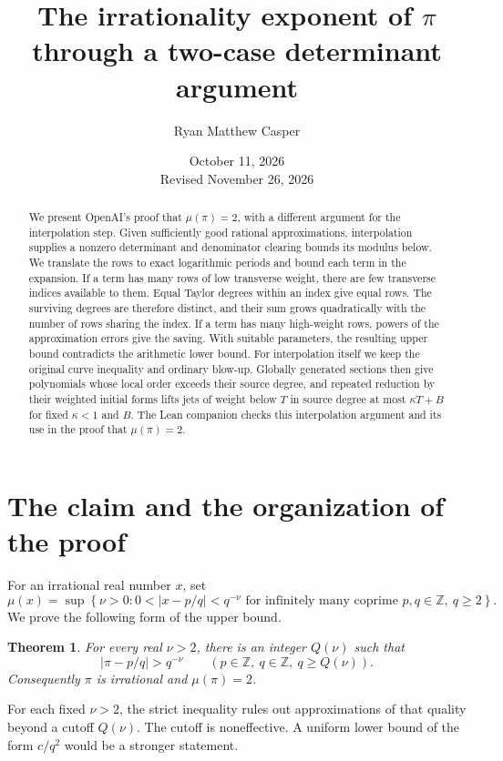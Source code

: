 \documentclass[11pt]{article}
\title{The irrationality exponent of \(\pi\)\\through a two-case determinant argument}
\author{Ryan Matthew Casper}
\date{October 11, 2026\\Revised November 26, 2026}
\newtheorem{theorem}{Theorem}[section]
\theoremstyle{definition}
\theoremstyle{remark}
\newcommand{\Z}{\mathbb Z}
\numberwithin{equation}{section}
\begin{document}
\maketitle
\begin{abstract}
We present OpenAI's proof that \(\mu(\pi)=2\), with a different argument
for the interpolation step. Given sufficiently good rational
approximations, interpolation supplies a nonzero determinant and
denominator clearing bounds its modulus below. We translate the rows
to exact logarithmic periods and bound each term in the expansion.
If a term has many rows of low transverse weight, there are few
transverse indices available to them. Equal Taylor degrees within an
index give equal rows. The surviving degrees are therefore distinct,
and their sum grows quadratically with the number of rows sharing the
index. If a term has many high-weight rows, powers of the approximation
errors give the saving. With suitable parameters, the resulting upper
bound contradicts the arithmetic lower bound.
For interpolation itself we keep the original curve inequality and
ordinary blow-up. Globally generated sections then give polynomials
whose local order exceeds their source degree, and repeated reduction
by their weighted initial forms lifts jets of weight below \(T\) in
source degree at most \(\kappa T+B\) for fixed \(\kappa<1\) and \(B\). The Lean
companion checks this interpolation argument and its use in the
proof that \(\mu(\pi)=2\).
\end{abstract}

\begingroup
\small
\setlength{\parskip}{0pt}
\tableofcontents
\endgroup
\clearpage

\section{The claim and the organization of the proof}
For an irrational real number \(x\), set
\[
 \mu(x)=\sup\left\{\nu>0:
 0<|x-p/q|<q^{-\nu}\text{ for infinitely many coprime }p,q\in\Z,
 \ q\ge2\right\}.
\]
We prove the following form of the upper bound.
\begin{theorem}\label{thm:main}
For every real \(\nu>2\), there is an integer \(Q(\nu)\) such that
\[
 |\pi-p/q|>q^{-\nu}\qquad(p\in\Z,\ q\in\Z,\ q\ge Q(\nu)).
\]
Consequently \(\pi\) is irrational and \(\mu(\pi)=2\).
\end{theorem}

For each fixed \(\nu>2\), the strict inequality rules out
approximations of that quality beyond a cutoff \(Q(\nu)\).
The cutoff is noneffective. A uniform lower bound of the form \(c/q^2\)
would be a stronger statement.
\end{document}
